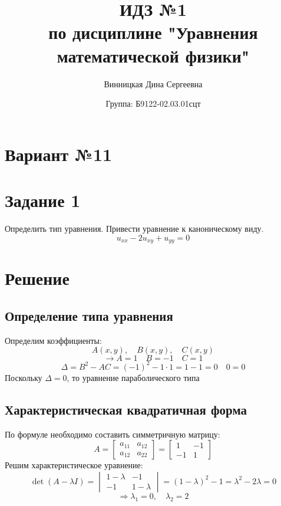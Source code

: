 \documentclass{article}
\title{\vspace{-1cm}ИДЗ №1 \\ по дисциплине "Уравнения математической физики"}
\author{Винницкая Дина Сергеевна}
\date{Группа: Б9122-02.03.01сцт}
\begin{document}
	
	\maketitle
\section*{Вариант №11}
\section*{Задание 1}

Определить тип уравнения. Привести уравнение к каноническому виду.
\[
u_{xx} - 2u_{xy} + u_{yy} = 0
\]

\section*{Решение}
\subsection{Определение типа уравнения}
Определим коэффициенты: $$A(x, y), \quad B(x,y), \quad C(x, y)$$
\[
\longrightarrow A = 1 \quad B = -1 \quad C = 1
\]
\[
\Delta = B^2 - AC = (-1)^{2} - 1 \cdot 1 = 1 - 1 = 0 \quad 0 = 0 
\]
Поскольку $\Delta  = 0$, то уравнение параболического типа

\subsection{Характеристическая квадратичная форма}

По формуле необходимо составить симметричную матрицу:
\[
A = 
\begin{bmatrix}
a_{11} & a_{12} \\
a_{12} & a_{22}
\end{bmatrix}
=
\begin{bmatrix}
1 & -1 \\
-1 & 1
\end{bmatrix}
\]
Решим характеристическое уравнение:
\[
\det(A - \lambda I) = 
\begin{vmatrix}
1 - \lambda & -1 \\
-1 & 1 - \lambda
\end{vmatrix}
= (1 - \lambda)^2 - 1 = \lambda^2 - 2\lambda = 0
\]
\[
\Rightarrow \lambda_1 = 0, \quad \lambda_2 = 2
\]
\end{document}
